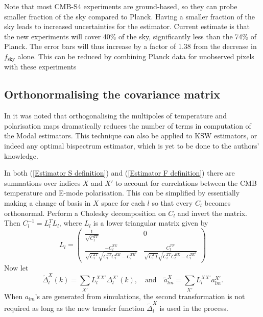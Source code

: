 Note that most CMB-S4 experiments are ground-based, so they can probe smaller fraction of the sky compared to Planck. Having a smaller fraction of the sky leads to  increased uncertainties for the estimator. Current estimate is that the new experiments will cover 40\% of the sky, significantly less than the 74\% of Planck. The error bars will thus increase by a factor of 1.38 from the decrease in $f_\text{sky}$ alone.  This can be reduced by combining Planck data for unobserved pixels with these experiments

\subsection{Orthonormalising the covariance matrix}

In \cite{Fergusson2014} it was noted that orthogonalising the multipoles of temperature and polarisation maps dramatically reduces the number of terms in computation of the Modal estimators. This technique can also be applied to KSW estimators, or indeed any optimal bispectrum estimator, which is yet to be done to the authors' knowledge.

In both (\ref{Estimator S definition}) and (\ref{Estimator F definition}) there are summations over indices $X$ and $X'$ to account for correlations between the CMB temperature and E-mode polarisation. This can be simplified by essentially making a change of basis in $X$ space for each $l$ so that every $C_l$ becomes orthonormal. Perform a Cholesky decomposition on $C_l$ and invert the matrix. Then $C_l^{-1} = L_l^T L_l$, where $L_l$ is a lower triangular matrix given by
\begin{equation}
	L_l = \begin{pmatrix} \frac{1}{\sqrt{C_l^{TT}}} & 0  \\ \frac{- C_l^{TE}}{\sqrt{C_l^{TT}} \sqrt{C_l^{TT} C_l^{EE} - C_l^{TE^2}}}  &  \frac{ C_l^{TT}}{\sqrt{C_l^TT} \sqrt{C_l^{TT} C_l^{EE} - C_l^{TE^2}}} \end{pmatrix}
\end{equation}
Now let
\begin{equation}
	\tilde{\Delta}_{l}^X (k) = \sum_{X'} L_l^{XX'} \Delta_{l}^{X'} (k), \quad\text{and}\quad \tilde{a}_{lm}^X = \sum_{X'} L_l^{XX'} a_{lm}^{X'}.
	\label{orthonormalisation}
\end{equation}
When $a_{lm}$'s are generated from simulations, the second transformation is not required as long as the new transfer function $\tilde{\Delta}_l^X$ is used in the process.

